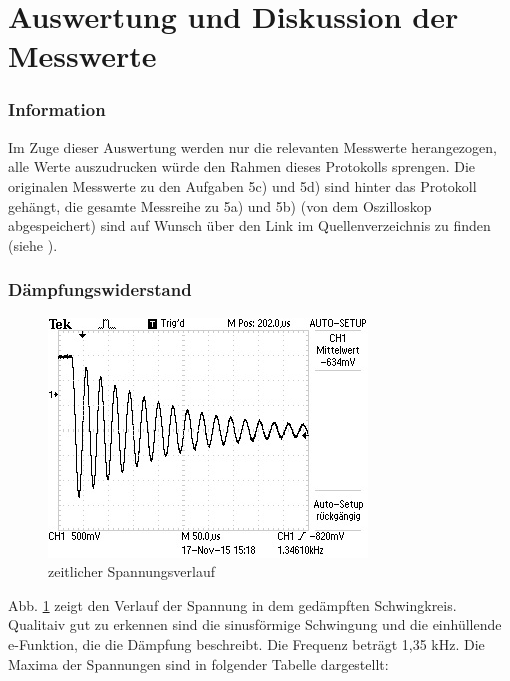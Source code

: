 \section{Auswertung und Diskussion der Messwerte}
\label{sec:Auswertung}
\subsubsection{Information}
Im Zuge dieser Auswertung werden nur die relevanten Messwerte herangezogen,
alle Werte auszudrucken würde den Rahmen dieses Protokolls sprengen.
Die originalen Messwerte zu den Aufgaben 5c) und 5d) sind hinter das Protokoll
gehängt, die gesamte Messreihe zu 5a) und 5b) (von dem Oszilloskop abgespeichert)
sind auf Wunsch über den Link im Quellenverzeichnis zu finden
(siehe \cite{messwerte}).
\subsubsection{Dämpfungswiderstand}
\begin{figure}
  \centering
  \includegraphics{data/F0000TEK.jpg}
  \caption{zeitlicher Spannungsverlauf}
  \label{fig:5aergebnis}
\end{figure}
Abb. \ref{fig:5aergebnis} zeigt den Verlauf der Spannung in dem gedämpften
Schwingkreis. Qualitaiv gut zu erkennen sind die sinusförmige Schwingung und
die einhüllende e-Funktion, die die Dämpfung beschreibt.
Die Frequenz beträgt 1,35 kHz.
Die Maxima der Spannungen sind in folgender Tabelle dargestellt:
